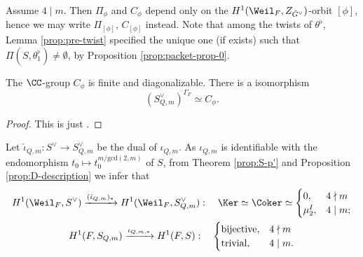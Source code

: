 \documentclass[a4paper,10pt]{article}
\begin{document}
\begin{remark}\label{rem:pre-packets}
	Assume $4 \mid m$. Then $\Pi_\phi$ and $C_\phi$ depend only on the $H^1(\Weil_F, Z_{\tilde{G}^\vee})$-orbit $[\phi]$, hence we may write $\Pi_{[\phi]}$, $C_{[\phi]}$ instead. Note that among the twists of $\theta^\flat$, Lemma \ref{prop:pre-twist} specified the unique one (if exists) such that $\Pi(S, \theta^\flat_1) \neq \emptyset$, by Proposition \ref{prop:packet-prop-0}.
\end{remark}	

\begin{lemma}\label{prop:isocrystal}
	The $\CC$-group $C_\phi$ is finite and diagonalizable. There is a isomorphism
	\[ (S_{Q,m}^\vee)^{\Gamma_F} \simeq C_\phi. \]
\end{lemma}
\begin{proof}
	This is just \cite[(5.2)]{Kal15}. %
\end{proof}

Let $\check{\iota}_{Q,m}: S^\vee \to S_{Q,m}^\vee$ be the dual of $\iota_{Q,m}$. As $\iota_{Q,m}$ is identifiable with the endomorphism $t_0 \mapsto t_0^{m/\text{gcd}(2,m)}$ of $S$, from Theorem \ref{prop:S-p'} and Proposition \ref{prop:D-description} we infer that
\begin{gather*}
	H^1(\Weil_F, S^\vee) \xrightarrow{(\check{\iota}_{Q,m})_*} H^1(\Weil_F, S_{Q,m}^\vee): \quad \Ker \simeq \Coker \simeq
	\begin{cases}
		0, & 4 \nmid m \\
		\mu_2^I, & 4 \mid m;
	\end{cases} \\
	H^1(F, S_{Q,m}) \xrightarrow{\iota_{Q,m,*}} H^1(F, S): \quad
	\begin{cases}
		\text{bijective}, & 4 \nmid m \\
		\text{trivial}, & 4 \mid m.
	\end{cases}
\end{gather*}
\end{document}
